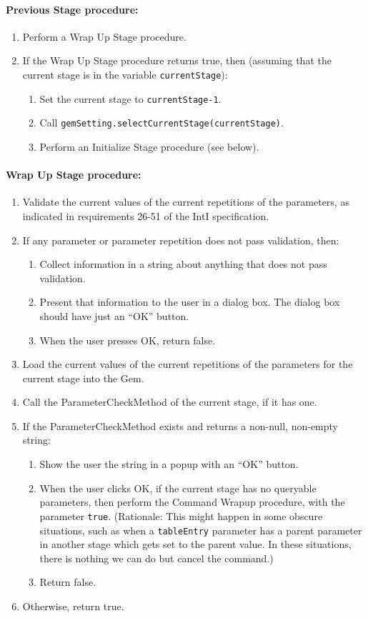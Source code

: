 \documentclass[11pt]{article}
\begin{document}
\paragraph{Previous Stage procedure:}
\begin{enumerate}
\item Perform a Wrap Up Stage procedure.
\item If the Wrap Up Stage procedure returns true, then (assuming
  that the current stage is in the variable {\tt currentStage}):
  \begin{enumerate}
  \item Set the current stage to \verb/currentStage-1/.
  \item Call {\tt gemSetting.selectCurrentStage(currentStage)}.
  \item Perform an Initialize Stage procedure (see below).
  \end{enumerate}
\end{enumerate}

\paragraph{Wrap Up Stage procedure:}
\begin{enumerate}
\item Validate the current values of the current repetitions of the
  parameters, as indicated in requirements 26-51 of the IntI
  specification.
\item If any parameter or parameter repetition does not pass validation,
  then:
  \begin{enumerate}
  \item Collect information in a string about anything that does
    not pass validation.
  \item Present that information to the user in a dialog box.
    The dialog box should have just an ``OK'' button.
  \item When the user presses OK, return false.
  \end{enumerate}
\item Load the current values of the current repetitions of the parameters
  for the current stage into the Gem.
\item Call the ParameterCheckMethod of the current stage, if it has one.
\item If the ParameterCheckMethod exists and returns a non-null, non-empty
  string:
  \begin{enumerate}
  \item Show the user the string in a popup with an ``OK'' button.
  \item When the user clicks OK, if the current stage has no queryable
    parameters, then perform the Command Wrapup procedure, with the
    parameter {\tt true}.  (Rationale:  This might happen in some obscure
    situations, such as when a {\tt tableEntry} parameter has a parent
    parameter in another stage which gets set to the parent value.  In
    these situations, there is nothing we can do but cancel the command.)
  \item Return false.
  \end{enumerate}
\item Otherwise, return true.
\end{enumerate}
\end{document}
